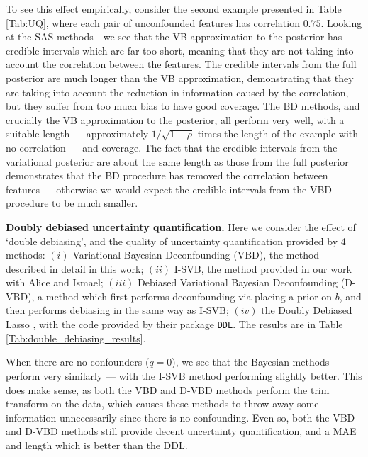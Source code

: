 \documentclass[11pt]{article}
\newcommand{\subparspacenonewline}{\vspace{3mm}}
\begin{document}
To see this effect empirically, consider the second example presented in Table \ref{Tab:UQ}, where each pair of unconfounded features has correlation $0.75$. Looking at the SAS methods - we see that the VB approximation to the posterior has credible intervals which are far too short, meaning that they are not taking into account the correlation between the features. The credible intervals from the full posterior are much longer than the VB approximation, demonstrating that they are taking into account the reduction in information caused by the correlation, but they suffer from too much bias to have good coverage. The BD methods, and crucially the VB approximation to the posterior, all perform very well, with a suitable length --- approximately $1/\sqrt{1-\rho}$ times the length of the example with no correlation --- and coverage. The fact that the credible intervals from the variational posterior are about the same length as those from the full posterior demonstrates that the BD procedure has removed the correlation between features --- otherwise we would expect the credible intervals from the VBD procedure to be much smaller.

\subparspacenonewline
{\bf Doubly debiased uncertainty quantification.}
Here we consider the effect of `double debiasing', and the quality of uncertainty quantification provided by 4 methods: $(i)$ Variational Bayesian Deconfounding (VBD), the method described in detail in this work; $(ii)$ I-SVB, the method provided in our work with Alice and Ismael; $(iii)$ Debiased Variational Bayesian Deconfounding (D-VBD), a method which first performs deconfounding via placing a prior on $b$, and then performs debiasing in the same way as I-SVB; $(iv)$ the Doubly Debiased Lasso \citep{GCB22}, with the code provided by their package \texttt{DDL}. The results are in Table \ref{Tab:double_debiasing_results}.

When there are no confounders ($q = 0$), we see that the Bayesian methods perform very similarly --- with the I-SVB method performing slightly better. This does make sense, as both the VBD and D-VBD methods perform the trim transform on the data, which causes these methods to throw away some information unnecessarily since there is no confounding. Even so, both the VBD and D-VBD methods still provide decent uncertainty quantification, and a MAE and length which is better than the DDL.
\end{document}
